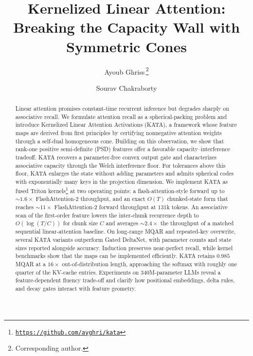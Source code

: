 \documentclass{article}
\title{Kernelized Linear Attention:\\Breaking the Capacity Wall with Symmetric Cones}
\author[ ]{Ayoub Ghriss\,\thanks{Corresponding author.}}
\author[ ]{Sourav Chakraborty}
\affil[ ]{\normalsize Department of Computer Science, University of Colorado Boulder}
\affil[ ]{\texttt{\{ayoub.ghriss, sourav.chakraborty\}@colorado.edu}}
\date{}
\newcommand{\1}{\bm{1}}
\theoremstyle{definition}
\begin{document}
\maketitle


\begin{abstract}
Linear attention promises constant-time recurrent inference but degrades sharply on associative recall.
We formulate attention recall as a spherical-packing problem and introduce Kernelized Linear Attention Activations (KATA),
a framework whose feature maps are derived from first principles by certifying nonnegative attention weights through a self-dual homogeneous cone.
Building on this observation, we show that rank-one positive semi-definite (PSD) features offer a favorable capacity--interference tradeoff.
KATA recovers a parameter-free convex output gate and characterizes associative capacity through the Welch interference floor.
For tolerances above this floor, KATA enlarges the state without adding parameters and admits spherical codes with exponentially many keys in the projection dimension.
We implement KATA as fused Triton kernels\footnote{\href{https://github.com/ayghri/kata}{\color{blue}\texttt{https://github.com/ayghri/kata}}} at two operating points: a flash-attention-style forward up to ${\sim}1.6\times$ FlashAttention-2 throughput, and an exact $O(T)$ chunked-state form that reaches ${\sim}11\times$ FlashAttention-2 forward throughput at $131$k tokens.
An associative scan of the first-order feature lowers the inter-chunk recurrence depth to $O(\log(T/C))$ for chunk size $C$ and averages ${\sim}2.4\times$ the throughput of a matched sequential linear-attention baseline.
On long-range MQAR and repeated-key overwrite, several KATA variants outperform Gated DeltaNet, with parameter counts and state sizes reported alongside accuracy.
Induction preserves near-perfect recall, while kernel benchmarks show that the maps can be implemented efficiently.
KATA retains $0.985$ MQAR at a $16\times$ out-of-distribution length, approaching the softmax with roughly one quarter of the KV-cache entries.
Experiments on 340M-parameter LLMs reveal a feature-dependent fluency trade-off and clarify how positional embeddings, delta rules, and decay gates interact with feature geometry.
\end{abstract}
\end{document}
